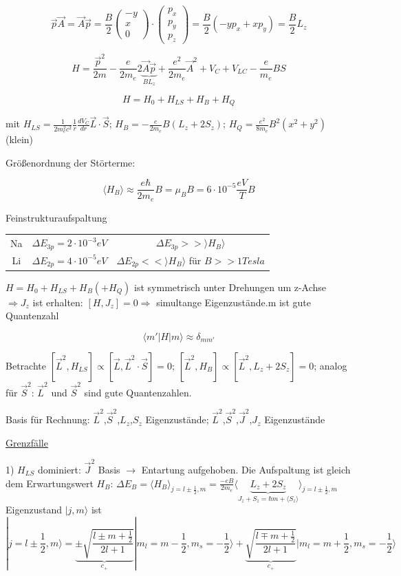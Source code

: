 \[\vec p \vec A = \vec A\vec p = \frac{B}{2}\begin{pmatrix} -y \\ x \\ 0 \end{pmatrix}\cdot\begin{pmatrix} p_x \\ p_y \\ p_z \end{pmatrix} = \frac{B}{2}(-yp_x + xp_y)=\frac{B}{2}L_z\]

\[ H=\frac{\vec p^2}{2m}-\frac{e}{2m_e}2\underbrace{\vec A\vec p}_{BL_z}+\frac{e^2}{2m_e}\vec A^2 + V_C+V_{LC}-\frac{e}{m_e}BS\]

\[H=H_0+H_{LS}+H_B+H_Q\]

mit \(H_{LS} = \frac{1}{2m^2_ec^2}\frac{1}{r}\frac{dV_C}{dr}\vec L\cdot\vec S\); \(H_B=-\frac{e}{2m_e}B(L_z+2S_z)\); \(H_Q = \frac{e^2}{8m_e}B^2(x^2+y^2)\) (klein)

Größenordnung der Störterme:

\[\langle H_B\rangle \approx \frac{e\hbar}{2m_e}B=\mu_BB = 6\cdot 10^{-5}\frac{eV}{T}B\]

Feinstrukturaufspaltung

\begin{tabular}{ccc}
  Na&\(\Delta E_{3p}=2\cdot 10^{-3}eV\) & \(\Delta E_{3p}>> \rangle H_B\rangle\) \\
  Li&\(\Delta E_{2p}=4\cdot 10^{-5}eV\) & \(\Delta E_{2p}<< \rangle H_B\rangle\) für \(B>>1Tesla\)
\end{tabular}

\(H=H_0+H_{LS}+H_B(+H_Q)\) ist symmetrisch unter Drehungen um z-Achse \(\Rightarrow J_z\) ist erhalten: \([H,J_z]=0 \Rightarrow\) simultange Eigenzustände.m ist gute Quantenzahl

\[ \langle m'|H|m\rangle \approx \delta_{mm'} \]

Betrachte \([\vec L^2,H_{LS}]\propto[\vec L,\vec L^2\cdot \vec S] = 0\); \([\vec L^2,H_{B}]\propto[\vec L^2,L_z+2S_z] = 0\); analog für \(\vec S^2\): \(\vec L^2\) und \(\vec S^2\) sind gute Quantenzahlen.

Basis für Rechnung: \(\vec L^2\),\(\vec S^2\),\(L_z\),\(S_z\) Eigenzustände; \(\vec L^2\),\(\vec S^2\),\(\vec J^2\),\(J_z\) Eigenzustände

\underline{Grenzfälle}

1) \(H_{LS}\) dominiert: \(\vec J^2\) Basis \(\rightarrow\) Entartung aufgehoben. Die Aufspaltung ist gleich dem Erwartungswert \(H_B\): \(\Delta E_B = \langle H_B\rangle_{j=l\pm\frac{1}{2},m}=\frac{-eB}{2m_e}\langle \underbrace{L_z+2S_z}_{J_z+S_z=\hbar m+\langle S_z\rangle}\rangle_{j=l\pm\frac{1}{2},m}\) Eigenzustand \(|j,m\rangle\) ist
\[ |j=l\pm \frac{1}{2},m\rangle = \underbrace{\pm\sqrt{\frac{l\pm m+\frac{1}{2}}{2l+1}}}_{c_+}|m_l=m-\frac{1}{2},m_s=-\frac{1}{2}\rangle +\underbrace{\sqrt{\frac{l\mp m+\frac{1}{2}}{2l+1}}}_{c_+}|m_l=m+\frac{1}{2},m_s=-\frac{1}{2}\rangle \]

